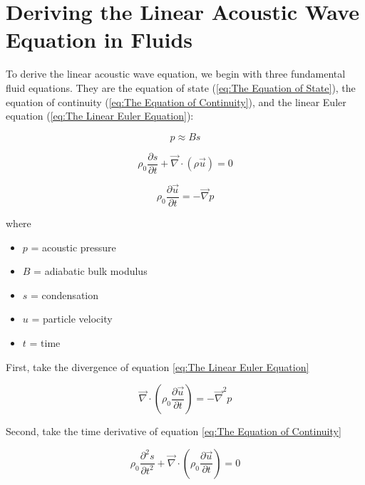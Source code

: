 \section{Deriving the Linear Acoustic Wave Equation in Fluids}

To derive the linear acoustic wave equation, we begin with three fundamental fluid equations. They are the equation of state (\ref{eq:The Equation of State}), the equation of continuity (\ref{eq:The Equation of Continuity}), and the linear Euler equation (\ref{eq:The Linear Euler Equation}):

\begin{equation} \label{eq:The Equation of State}
    p \approx B s
\end{equation}

\begin{equation} \label{eq:The Equation of Continuity}
    \rho_0 \frac{\partial s}{\partial t} + \vec{\nabla} \cdot (\rho \vec{u}) = 0
\end{equation}

\begin{equation} \label{eq:The Linear Euler Equation}
    \rho_0 \frac{\partial \vec{u}}{\partial t} = - \vec{\nabla} p
\end{equation}

where

\begin{itemize}
    \item $p$ = acoustic pressure
    \item $B$ = adiabatic bulk modulus
    \item $s$ = condensation
    \item $u$ = particle velocity
    \item $t$ = time
\end{itemize}

First, take the divergence of equation \ref{eq:The Linear Euler Equation}

\begin{equation} \label{eq:Divergence of Linear Euler Equation}
    \vec{\nabla} \cdot \left( \rho_0 \frac{\partial \vec{u}}{\partial t} \right) = -\vec{\nabla}^2 p
\end{equation}

Second, take the time derivative of equation \ref{eq:The Equation of Continuity}

\begin{equation} \label{eq:Time Derivative of Continuity Equation}
    \rho_0 \frac{\partial^2 s}{\partial t^2} + \vec{\nabla} \cdot \left(\rho_0 \frac{\partial \vec{u}}{\partial t}\right) = 0
\end{equation}

